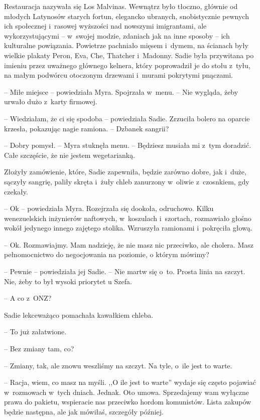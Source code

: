 \documentclass[oneside,polish,11pt,sfheadings]{mwbk}
\begin{document}
Restauracja nazywała się Los Malvinas. Wewnątrz było tłoczno, głównie od
młodych Latynosów starych fortun, elegancko ubranych, snobistycznie
pewnych ich społecznej i~rasowej wyższości nad nowszymi imigrantami, ale
wykorzystującymi -- w~swojej modzie, zdaniach jak na inne sposoby -- ich
kulturalne powiązania. Powietrze pachniało mięsem i~dymem, na ścianach
były wielkie plakaty Peron, Eva, Che, Thatcher i~Madonny. Sadie była
przywitana po imieniu przez uważnego głównego kelnera, który poprowadził
je do stołu z~tyłu, na małym podwórcu otoczonym drzewami i~murami
pokrytymi pnączami.

-- Miłe miejsce -- powiedziała Myra. Spojrzała w~menu. -- Nie wygląda, żeby
urwało dużo z~karty firmowej.

-- Wiedziałam, że ci się spodoba -- powiedziała Sadie. Zrzuciła bolero na
oparcie krzesła, pokazując nagie ramiona. -- Dzbanek sangrii?

-- Dobry pomysł. -- Myra stuknęła menu. -- Będziesz musiała mi z~tym
doradzić. Całe szczęście, że nie jestem wegetarianką.

Złożyły zamówienie, które, Sadie zapewniła, będzie zarówno dobre, jak i~duże, sączyły sangrię, paliły skręta i~żuły chleb zanurzony w~oliwie z~czosnkiem, gdy czekały.

-- Ok -- powiedziała Myra. Rozejrzała się dookoła, odruchowo. Kilku
wenezuelskich inżynierów naftowych, w~koszulach i~szortach, rozmawiało
głośno wokół jedynego innego zajętego stolika. Wzruszyła ramionami i~pokręciła głową. 

-- Ok. Rozmawiajmy. Mam nadzieję, że nie masz nic
przeciwko, ale cholera. Masz pełnomocnictwo do negocjowania na poziomie,
o którym mówimy?

-- Pewnie -- powiedziała jej Sadie. -- Nie martw się o~to. Prosta linia na
szczyt. Nie, żeby to był wysoki priorytet u Szefa.

-- A co z~ONZ?

Sadie lekceważąco pomachała kawałkiem chleba. 

-- To już załatwione.

-- Bez zmiany tam, co?

-- Zmiany, tak, ale znowu weszliśmy na szczyt. Na tyle, o~ile jest to
warte.

-- Racja, wiem, co masz na myśli. ,,O ile jest to warte'' wydaje się
często pojawiać w~rozmowach w~tych dniach. Jednak. Oto umowa.
Sprzedajemy wam wyłączne prawa do pakietu, wspieracie nas przeciwko
hordom komunistów. Lista zakupów będzie następna, ale jak mówiłaś,
szczegóły później.
\end{document}
